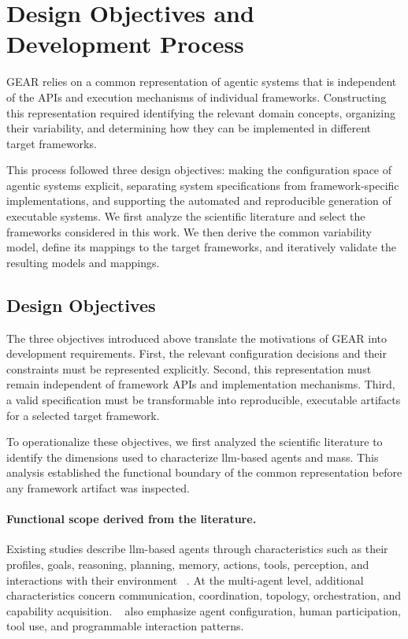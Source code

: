\section{Design Objectives and Development Process}
\label{sec:gear-design-construction}

GEAR relies on a common representation of agentic systems that is independent
of the APIs and execution mechanisms of individual frameworks. Constructing
this representation required identifying the relevant domain concepts,
organizing their variability, and determining how they can be implemented in
different target frameworks.

This process followed three design objectives: making the configuration space
of agentic systems explicit, separating system specifications from
framework-specific implementations, and supporting the automated and
reproducible generation of executable systems. We first analyze the scientific
literature and select the frameworks considered in this work. We then derive
the common variability model, define its mappings to the target frameworks,
and iteratively validate the resulting models and mappings.


\subsection{Design Objectives}
\label{subsec:design-objectives}

The three objectives introduced above translate the motivations of GEAR into
development requirements. First, the relevant configuration decisions and
their constraints must be represented explicitly. Second, this representation
must remain independent of framework APIs and implementation mechanisms.
Third, a valid specification must be transformable into reproducible,
executable artifacts for a selected target framework.

To operationalize these objectives, we first analyzed the scientific
literature to identify the dimensions used to characterize \gls{llm}-based
agents and \gls{mas}s. This analysis established the functional boundary of
the common representation before any framework artifact was inspected.

\paragraph{\textbf{Functional scope derived from the literature.}}
Existing studies describe \gls{llm}-based agents through characteristics such
as their profiles, goals, reasoning, planning, memory, actions, tools,
perception, and interactions with their environment
~\cite{xi2025rise,guo2024large}. At the multi-agent level, additional
characteristics concern communication, coordination, topology, orchestration,
and capability acquisition. ~\cite{wu2024autogen} also emphasize agent
configuration, human participation, tool use, and programmable interaction
patterns.

